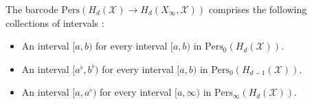 \begin{corollary}
The barcode $\mathrm{Pers}(H_{d}(\mathcal{X}) \rightarrow H_{d}(X_{\infty}, \mathcal{X}))$ comprises the following collections of intervals \cite[\S 2.5]{de2011dualities}:
\begin{itemize}
    \item An interval $[a, b)$ for every interval $[a, b)$ in $\mathrm{Pers}_{0}(H_{d}(\mathcal{X}))$.
    \item An interval $[a^{\flat}, b^{\flat})$ for every interval $[a, b)$ in $\mathrm{Pers}_{0}(H_{d-1}(\mathcal{X}))$.
    \item An interval $[a, a^{\flat})$ for every interval $[a, \infty)$ in $\mathrm{Pers}_{\infty}(H_{d}(\mathcal{X}))$.
\end{itemize}
\end{corollary}

